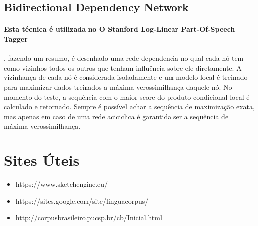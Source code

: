 \documentclass[a4paper, 10pt]{article}
\begin{document}
    	\subsection{Bidirectional Dependency Network}
        	\paragraph{Esta técnica é utilizada no O Stanford Log-Linear Part-Of-Speech Tagger}, fazendo um resumo, é desenhado uma rede dependencia no qual cada nó tem como vizinhos todos os outros que tenham influência sobre ele diretamente. A vizinhança de cada nó é considerada isoladamente e um modelo local é treinado para maximizar dados treinados a máxima verossimilhança daquele nó. No momento do teste, a sequência com o maior score do produto condicional local é calculado e retornado. Sempre é possível achar a sequência de maximização exata, mas apenas em caso de uma rede aciciclica é garantida ser a sequência de máxima verossimilhança.
			

    \section{Sites Úteis}
        \begin{itemize}
            \item https://www.sketchengine.eu/
            \item https://sites.google.com/site/linguacorpus/
            \item http://corpusbrasileiro.pucsp.br/cb/Inicial.html
        \end{itemize}
\end{document}
